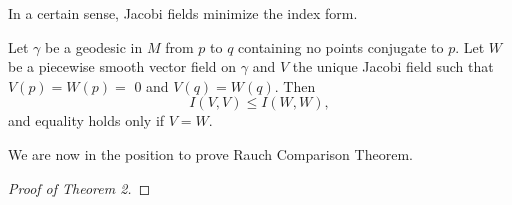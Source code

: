 \documentclass{ctexart}
\begin{document}
In a certain sense, Jacobi fields minimize the index form. 
\begin{lemma}
  Let $\gamma$ be a geodesic in $M$ from $p$ to $q$ containing no points conjugate to $p$. Let $W$ be a piecewise smooth vector field on $\gamma$ 
  and $V$ the unique Jacobi field such that $V(p)=W(p)=$ 0 and $V(q)=W(q)$. Then 
  $$
  I(V, V) \leq I(W, W), 
  $$
  and equality holds only if $V=W$.
\end{lemma}

We are now in the position to prove Rauch Comparison Theorem.
\begin{proof}[Proof of Theorem 2]
  
\end{proof}



\end{document}
